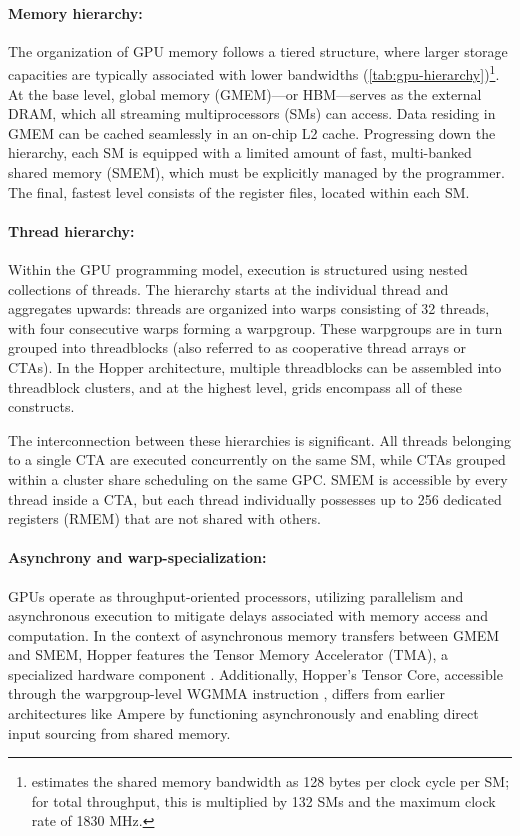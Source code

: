 \paragraph{Memory hierarchy:} The organization of GPU memory follows a tiered structure, where larger storage capacities are typically associated with lower bandwidths (\cref{tab:gpu-hierarchy})\footnote{\citet{luo2024benchmarking} estimates the shared memory bandwidth as 128 bytes per clock cycle per SM; for total throughput, this is multiplied by 132 SMs and the maximum clock rate of 1830 MHz.}. At the base level, global memory (GMEM)—or HBM—serves as the external DRAM, which all streaming multiprocessors (SMs) can access. Data residing in GMEM can be cached seamlessly in an on-chip L2 cache. Progressing down the hierarchy, each SM is equipped with a limited amount of fast, multi-banked shared memory (SMEM), which must be explicitly managed by the programmer. The final, fastest level consists of the register files, located within each SM.

\paragraph{Thread hierarchy:} Within the GPU programming model, execution is structured using nested collections of threads. The hierarchy starts at the individual thread and aggregates upwards: threads are organized into warps consisting of 32 threads, with four consecutive warps forming a warpgroup. These warpgroups are in turn grouped into threadblocks (also referred to as cooperative thread arrays or CTAs). In the Hopper architecture, multiple threadblocks can be assembled into threadblock clusters, and at the highest level, grids encompass all of these constructs.

The interconnection between these hierarchies is significant. All threads belonging to a single CTA are executed concurrently on the same SM, while CTAs grouped within a cluster share scheduling on the same GPC. SMEM is accessible by every thread inside a CTA, but each thread individually possesses up to 256 dedicated registers (RMEM) that are not shared with others.

\paragraph{Asynchrony and warp-specialization:}

GPUs operate as throughput-oriented processors, utilizing parallelism and asynchronous execution to mitigate delays associated with memory access and computation. In the context of asynchronous memory transfers between GMEM and SMEM, Hopper features the Tensor Memory Accelerator (TMA), a specialized hardware component \cite[\S7.29]{cuda}. Additionally, Hopper’s Tensor Core, accessible through the warpgroup-level WGMMA instruction \cite[\S9.7.14]{ptx}, differs from earlier architectures like Ampere by functioning asynchronously and enabling direct input sourcing from shared memory.

